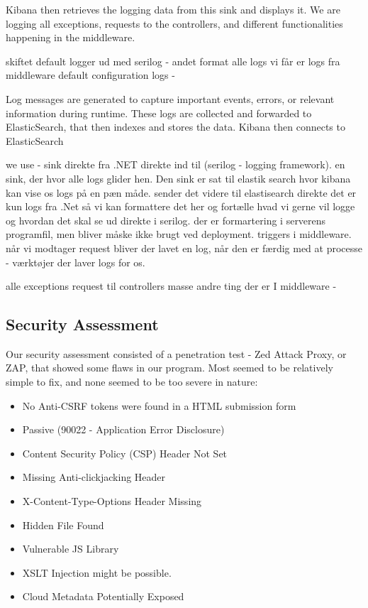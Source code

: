 Kibana then retrieves the logging data from this sink and displays it.
We are logging all exceptions, requests to the controllers, and different functionalities happening in the middleware. 

skiftet default logger ud med serilog - andet format 
alle logs vi får er logs fra middleware 
default configuration logs - 


Log messages are generated to capture important events, errors, or relevant information during runtime. These logs are collected and forwarded to ElasticSearch, that then indexes and stores the data. Kibana then connects to ElasticSearch 

we use - sink direkte fra .NET direkte ind til (serilog - logging framework). en sink, der hvor alle logs glider hen. Den sink er sat til elastik search hvor kibana kan vise os logs på en pæn måde.
sender det videre til elastisearch direkte
det er kun logs fra .Net så vi kan formattere det her og fortælle hvad vi gerne vil logge og hvordan det skal se ud direkte i serilog. 
der er formartering i serverens programfil, men bliver måske ikke brugt ved deployment. 
triggers i middleware. når vi modtager request bliver der lavet en log, når den er færdig med at processe - værktøjer der laver logs for os. 

alle exceptions
request til controllers
masse andre ting der er I middleware - 


\subsection{Security Assessment}

Our security assessment consisted of a penetration test - Zed Attack Proxy, or ZAP, that showed some flaws in our program. Most seemed to be relatively simple to fix, and none seemed to be too severe in nature:
\begin{itemize}
    \item No Anti-CSRF tokens were found in a HTML submission form
    \item Passive (90022 - Application Error Disclosure)
    \item Content Security Policy (CSP) Header Not Set
    \item Missing Anti-clickjacking Header
    \item X-Content-Type-Options Header Missing
    \item Hidden File Found
    \item Vulnerable JS Library
    \item XSLT Injection might be possible.
    \item Cloud Metadata Potentially Exposed
\end{itemize}

